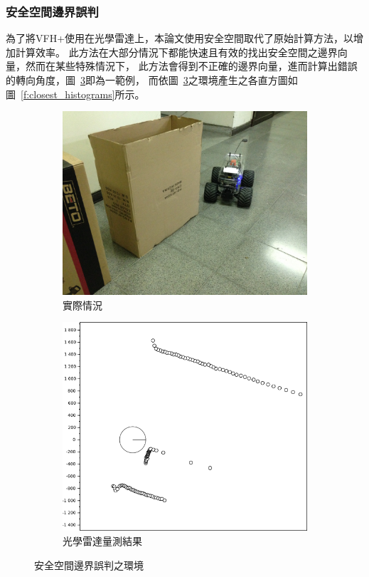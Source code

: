 \subsubsection{安全空間邊界誤判}
為了將VFH+使用在光學雷達上，本論文使用安全空間取代了原始計算方法，以增加計算效率。
此方法在大部分情況下都能快速且有效的找出安全空間之邊界向量，然而在某些特殊情況下，
此方法會得到不正確的邊界向量，進而計算出錯誤的轉向角度，圖~\ref{f:wrong_boundary}即為一範例，
而依圖~\ref{f:wrong_boundary}之環境產生之各直方圖如圖~\ref{f:closest_histograms}所示。
\begin{figure}[h!]
	\centering
	\begin{subfigure}[t]{0.51\textwidth}
		\includegraphics[width=\textwidth]{figures/algorithm/wrong_boundary_real}
		\caption{實際情況}
		\label{f:wrong_boundary_real}
	\end{subfigure}
	\begin{subfigure}[t]{0.45\textwidth}
		\includegraphics[width=\textwidth]{figures/algorithm/wrong_boundary}
		\caption{光學雷達量測結果}
		\label{f:wrong_boundary_m}
	\end{subfigure}
	\caption{安全空間邊界誤判之環境}
	\label{f:wrong_boundary}
\end{figure}
